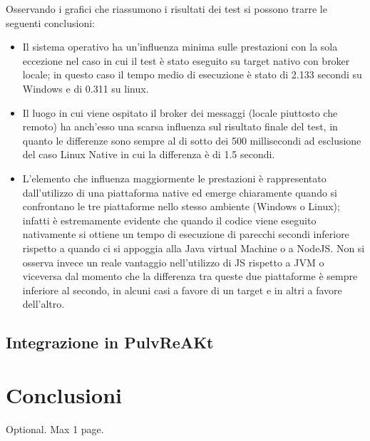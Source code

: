 \documentclass[12pt,a4paper,openright,twoside]{book}
\begin{document}
Osservando i grafici che riassumono i risultati dei test si possono trarre le seguenti conclusioni:\begin{itemize}
    \item Il sistema operativo ha un’influenza minima sulle prestazioni con la sola eccezione nel caso in cui il test è stato eseguito su target nativo con broker locale; 
    in questo caso il tempo medio di esecuzione è stato di 2.133 secondi su Windows e di 0.311 su linux.

    \item Il luogo in cui viene ospitato il broker dei messaggi (locale piuttosto che remoto) ha anch’esso una scarsa influenza sul risultato finale del test, 
    in quanto le differenze sono sempre al di sotto dei 500 millisecondi ad esclusione del caso Linux Native in cui la differenza è di 1.5 secondi. 

    \item L’elemento che influenza maggiormente le prestazioni è rappresentato dall’utilizzo di una piattaforma native ed emerge chiaramente quando si confrontano 
    le tre piattaforme nello stesso ambiente (Windows o Linux); infatti è estremamente evidente che quando il codice viene eseguito nativamente si ottiene un tempo 
    di esecuzione di parecchi secondi inferiore rispetto a quando ci si appoggia alla Java virtual Machine o a NodeJS. Non si osserva invece un reale vantaggio nell’utilizzo 
    di JS rispetto a JVM o viceversa dal momento che la differenza tra queste due piattaforme è sempre inferiore al secondo, in alcuni casi a favore di un target e in altri a 
    favore dell'altro.

\end{itemize}

\section{Integrazione in PulvReAKt}

\chapter{Conclusioni}\label{chap:Conclusioni}


\backmatter

\nocite{*} %




\begin{acknowledgements} %
Optional. Max 1 page.
\end{acknowledgements}
\end{document}
